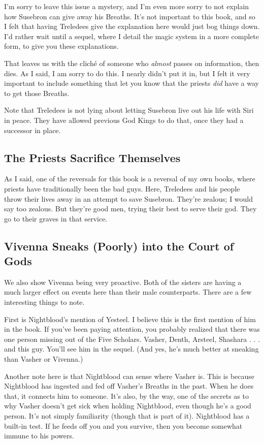 I’m sorry to leave this issue a mystery, and I’m even more sorry to not explain how Susebron can give away his Breaths. It’s not important to this book, and so I felt that having Treledees give the explanation here would just bog things down. I’d rather wait until a sequel, where I detail the magic system in a more complete form, to give you these explanations.

That leaves us with the cliché of someone who \textit{almost} passes on information, then dies. As I said, I am sorry to do this. I nearly didn’t put it in, but I felt it very important to include something that let you know that the priests \textit{did} have a way to get those Breaths.

Note that Treledees is not lying about letting Susebron live out his life with Siri in peace. They have allowed previous God Kings to do that, once they had a successor in place.

\subsection*{The Priests Sacrifice Themselves}

As I said, one of the reversals for this book is a reversal of my own books, where priests have traditionally been the bad guys. Here, Treledees and his people throw their lives away in an attempt to save Susebron. They’re zealous; I would say too zealous. But they’re good men, trying their best to serve their god. They go to their graves in that service.

\subsection*{Vivenna Sneaks (Poorly) into the Court of Gods}

We also show Vivenna being very proactive. Both of the sisters are having a much larger effect on events here than their male counterparts. There are a few interesting things to note.

First is Nightblood’s mention of Yesteel. I believe this is the first mention of him in the book. If you’ve been paying attention, you probably realized that there was one person missing out of the Five Scholars. Vasher, Denth, Arsteel, Shashara . . . and this guy. You’ll see him in the sequel. (And yes, he’s much better at sneaking than Vasher or Vivenna.)

Another note here is that Nightblood can sense where Vasher is. This is because Nightblood has ingested and fed off Vasher’s Breaths in the past. When he does that, it connects him to someone. It’s also, by the way, one of the secrets as to why Vasher doesn’t get sick when holding Nightblood, even though he’s a good person. It’s not simply familiarity (though that is part of it). Nightblood has a built-in test. If he feeds off you and you survive, then you become somewhat immune to his powers.

